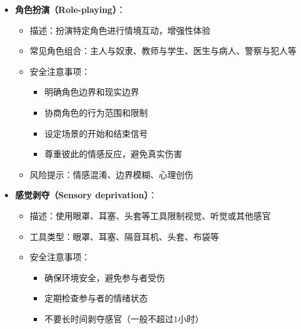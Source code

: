 \documentclass[12pt,UTF8]{ctexbook}
\begin{document}
\begin{itemize}
    \begin{itemize}
    \item 描述：使用鞭子、皮鞭、藤条等工具对身体进行有控制的抽打
    \item 工具类型：马鞭、皮鞭、藤条、拍子、散鞭等
    \item 安全注意事项：
      \begin{itemize}
      \item 避开头部、脊柱、关节、肾脏等敏感部位
      \item 从较轻的力度开始，逐渐增加强度
      \item 了解不同工具的使用方法和安全区域
      \item 保持工具清洁，避免感染
      \end{itemize}
    \item 风险提示：皮肤损伤、瘀伤、肌肉损伤、感染
    \end{itemize}
  \item \textbf{角色扮演（Role-playing）}：
    \begin{itemize}
    \item 描述：扮演特定角色进行情境互动，增强性体验
    \item 常见角色组合：主人与奴隶、教师与学生、医生与病人、警察与犯人等
    \item 安全注意事项：
      \begin{itemize}
      \item 明确角色边界和现实边界
      \item 协商角色的行为范围和限制
      \item 设定场景的开始和结束信号
      \item 尊重彼此的情感反应，避免真实伤害
      \end{itemize}
    \item 风险提示：情感混淆、边界模糊、心理创伤
    \end{itemize}
  \item \textbf{感觉剥夺（Sensory deprivation）}：
    \begin{itemize}
    \item 描述：使用眼罩、耳塞、头套等工具限制视觉、听觉或其他感官
    \item 工具类型：眼罩、耳塞、隔音耳机、头套、布袋等
    \item 安全注意事项：
      \begin{itemize}
      \item 确保环境安全，避免参与者受伤
      \item 定期检查参与者的情绪状态
      \item 不要长时间剥夺感官（一般不超过1小时）

\end{itemize}
\end{itemize}
\end{itemize}
\end{document}

